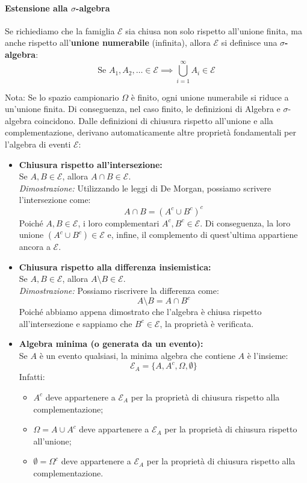 \paragraph{Estensione alla $\sigma$-algebra}
Se richiediamo che la famiglia $\mathcal{E}$ sia chiusa non solo rispetto all'unione finita, ma anche rispetto all'\textbf{unione numerabile} (infinita), allora $\mathcal{E}$ si definisce una \textbf{$\sigma$-algebra}:
\[
\text{Se } A_1, A_2, \dots \in \mathcal{E} \implies \bigcup_{i=1}^{\infty} A_i \in \mathcal{E}
\]

Nota: Se lo spazio campionario $\Omega$ è finito, ogni unione numerabile si riduce a un'unione finita. Di conseguenza, nel caso finito, le definizioni di Algebra e $\sigma$-algebra coincidono.
\clearpage
Dalle definizioni di chiusura rispetto all'unione e alla complementazione, derivano automaticamente altre proprietà fondamentali per l'algebra di eventi $\mathcal{E}$:

\begin{itemize}
    \item \textbf{Chiusura rispetto all'intersezione:} \\
    Se $A, B \in \mathcal{E}$, allora $A \cap B \in \mathcal{E}$. \\
    \textit{Dimostrazione:} Utilizzando le leggi di De Morgan, possiamo scrivere l'intersezione come:
    \[ A \cap B = (A^c \cup B^c)^c \]
    Poiché $A, B \in \mathcal{E}$, i loro complementari $A^c, B^c \in \mathcal{E}$. Di conseguenza, la loro unione $(A^c \cup B^c) \in \mathcal{E}$ e, infine, il complemento di quest'ultima appartiene ancora a $\mathcal{E}$.

    \item \textbf{Chiusura rispetto alla differenza insiemistica:} \\
    Se $A, B \in \mathcal{E}$, allora $A \setminus B \in \mathcal{E}$. \\
    \textit{Dimostrazione:} Possiamo riscrivere la differenza come:
    \[ A \setminus B = A \cap B^c \]
    Poiché abbiamo appena dimostrato che l'algebra è chiusa rispetto all'intersezione e sappiamo che $B^c \in \mathcal{E}$, la proprietà è verificata.

    \item \textbf{Algebra minima (o generata da un evento):} \\
    Se $A$ è un evento qualsiasi, la minima algebra che contiene $A$ è l'insieme:
    \[ \mathcal{E}_A = \{A, A^c, \Omega, \emptyset\} \]
    Infatti:
    \begin{itemize}
        \item[$\dagger$] $A^c$ deve appartenere a $\mathcal{E}_A$ per la proprietà di chiusura rispetto alla complementazione;
        \item[$\dagger$] $\Omega = A \cup A^c$ deve appartenere a $\mathcal{E}_A$ per la proprietà di chiusura rispetto all'unione;
        \item[$\dagger$] $\emptyset = \Omega^c$ deve appartenere a $\mathcal{E}_A$ per la proprietà di chiusura rispetto alla complementazione.
    \end{itemize}
\end{itemize}

